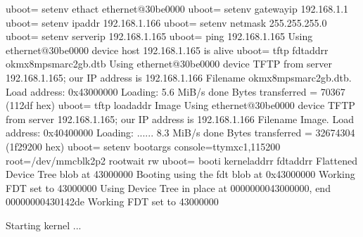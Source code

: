 \documentclass[letterpaper,10pt,openany,english]{sphinxmanual}
\begin{document}
\begin{sphinxVerbatim}[commandchars=\\\{\}]
u\PYGZhy{}boot=\PYGZgt{} setenv ethact ethernet@30be0000
u\PYGZhy{}boot=\PYGZgt{} setenv gatewayip 192.168.1.1
u\PYGZhy{}boot=\PYGZgt{} setenv ipaddr 192.168.1.166
u\PYGZhy{}boot=\PYGZgt{} setenv netmask 255.255.255.0
u\PYGZhy{}boot=\PYGZgt{} setenv serverip 192.168.1.165
u\PYGZhy{}boot=\PYGZgt{} ping 192.168.1.165
Using ethernet@30be0000 device
host 192.168.1.165 is alive
u\PYGZhy{}boot=\PYGZgt{} tftp \PYGZdl{}\PYGZob{}fdt\PYGZus{}addr\PYGZus{}r\PYGZcb{} ok\PYGZhy{}mx8mp\PYGZhy{}smarc\PYGZhy{}2gb.dtb
Using ethernet@30be0000 device
TFTP from server 192.168.1.165; our IP address is 192.168.1.166
Filename \PYGZsq{}ok\PYGZhy{}mx8mp\PYGZhy{}smarc\PYGZhy{}2gb.dtb\PYGZsq{}.
Load address: 0x43000000
Loading: \PYGZsh{}\PYGZsh{}\PYGZsh{}\PYGZsh{}\PYGZsh{}
         5.6 MiB/s
done
Bytes transferred = 70367 (112df hex)
u\PYGZhy{}boot=\PYGZgt{} tftp \PYGZdl{}\PYGZob{}loadaddr\PYGZcb{} Image
Using ethernet@30be0000 device
TFTP from server 192.168.1.165; our IP address is 192.168.1.166
Filename \PYGZsq{}Image\PYGZsq{}.
Load address: 0x40400000
Loading: \PYGZsh{}\PYGZsh{}\PYGZsh{}\PYGZsh{}\PYGZsh{}\PYGZsh{}\PYGZsh{}\PYGZsh{}\PYGZsh{}\PYGZsh{}\PYGZsh{}\PYGZsh{}\PYGZsh{}\PYGZsh{}\PYGZsh{}\PYGZsh{}\PYGZsh{}\PYGZsh{}\PYGZsh{}\PYGZsh{}\PYGZsh{}\PYGZsh{}\PYGZsh{}\PYGZsh{}\PYGZsh{}\PYGZsh{}\PYGZsh{}\PYGZsh{}\PYGZsh{}\PYGZsh{}\PYGZsh{}\PYGZsh{}\PYGZsh{}\PYGZsh{}\PYGZsh{}\PYGZsh{}\PYGZsh{}\PYGZsh{}\PYGZsh{}\PYGZsh{}\PYGZsh{}\PYGZsh{}\PYGZsh{}\PYGZsh{}\PYGZsh{}\PYGZsh{}\PYGZsh{}\PYGZsh{}\PYGZsh{}\PYGZsh{}\PYGZsh{}\PYGZsh{}\PYGZsh{}\PYGZsh{}\PYGZsh{}\PYGZsh{}\PYGZsh{}\PYGZsh{}\PYGZsh{}\PYGZsh{}\PYGZsh{}\PYGZsh{}\PYGZsh{}\PYGZsh{}\PYGZsh{}
......
        \PYGZsh{}\PYGZsh{}\PYGZsh{}\PYGZsh{}\PYGZsh{}\PYGZsh{}\PYGZsh{}\PYGZsh{}\PYGZsh{}\PYGZsh{}\PYGZsh{}\PYGZsh{}\PYGZsh{}\PYGZsh{}\PYGZsh{}\PYGZsh{}
         8.3 MiB/s
done
Bytes transferred = 32674304 (1f29200 hex)
u\PYGZhy{}boot=\PYGZgt{} setenv bootargs console=ttymxc1,115200 root=/dev/mmcblk2p2 rootwait rw
u\PYGZhy{}boot=\PYGZgt{} booti \PYGZdl{}\PYGZob{}kernel\PYGZus{}addr\PYGZus{}r\PYGZcb{} \PYGZhy{} \PYGZdl{}\PYGZob{}fdt\PYGZus{}addr\PYGZus{}r\PYGZcb{}
\PYGZsh{}\PYGZsh{} Flattened Device Tree blob at 43000000
   Booting using the fdt blob at 0x43000000
Working FDT set to 43000000
   Using Device Tree in place at 0000000043000000, end 00000000430142de
Working FDT set to 43000000

Starting kernel ...
\end{sphinxVerbatim}
\end{document}

